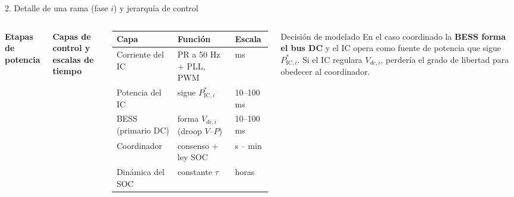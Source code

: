 \documentclass[aspectratio=169,11pt]{beamer}
\newcommand{\Picr}[1]{P^{*}_{\mathrm{IC},#1}}
\begin{document}
\begin{frame}{2. Detalle de una rama (fase $i$) y jerarquía de control}
  \begin{columns}[T]
    \centering\textbf{\small Etapas de potencia}\\[3pt]
    \centering\textbf{\small Capas de control y escalas de tiempo}\\[3pt]
    \scriptsize
    \begin{tabular}{@{}lll@{}}
      \toprule
      Capa & Función & Escala \\ \midrule
      Corriente del IC & PR a 50 Hz + PLL, PWM & ms \\
      Potencia del IC & sigue $\Picr{i}$ & 10--100 ms \\
      BESS (primario DC) & forma $V_{dc,i}$ (droop $V$--$P$) & 10--100 ms \\
      \alert{Coordinador} & consenso + ley SOC & s -- min \\
      Dinámica del SOC & constante $\tau$ & horas \\ \bottomrule
    \end{tabular}

    \vspace{4pt}
    \begin{block}{Decisión de modelado}
      \scriptsize En el caso coordinado la \textbf{BESS forma el bus DC} y el IC opera como fuente de potencia que sigue $\Picr{i}$. Si el IC regulara $V_{dc,i}$, perdería el grado de libertad para obedecer al coordinador.
    \end{block}
  \end{columns}
\end{frame}
\end{document}
